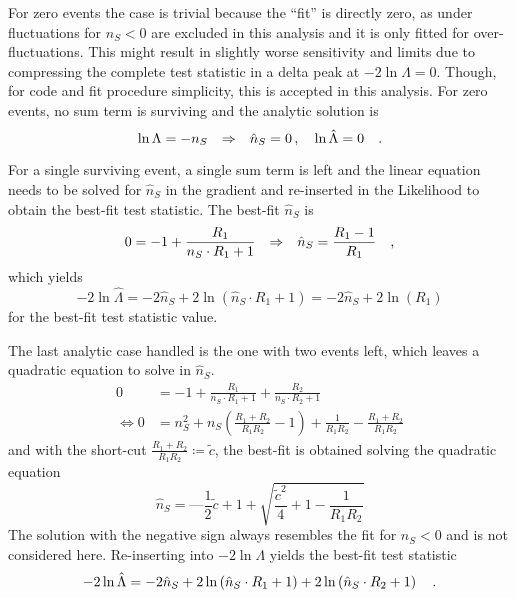 For zero events the case is trivial because the \enquote{fit} is directly zero, as under fluctuations for $n_S < 0$ are excluded in this analysis and it is only fitted for over-fluctuations.
This might result in slightly worse sensitivity and limits due to compressing the complete test statistic in a delta peak at $-2\ln\Lambda=0$.
Though, for code and fit procedure simplicity, this is accepted in this analysis. 
For zero events, no sum term is surviving and the analytic solution is
\begin{equation}
  \ln\Lambda = -n_S
  \quad\text{$\Rightarrow$}\quad
  \hat{n}_S = 0 \, ,\quad \ln\hat{\Lambda} = 0
  \quad\text{.}
\end{equation}

For a single surviving event, a single sum term is left and the linear equation needs to be solved for $\hat{n}_S$ in the gradient and re-inserted in the Likelihood to obtain the best-fit test statistic.
The best-fit $\hat{n}_S$ is
\begin{equation}
  0 = -1 + \frac{R_1}{n_S\cdot R_1 + 1}
  \quad\text{$\Rightarrow$}\quad
  \hat{n}_S = \frac{R_1 - 1}{R_1}
  \quad\text{,}
\end{equation}
which yields
\begin{equation}
  -2\ln\hat{\Lambda}
    = -2\hat{n}_S + 2\ln\left( \hat{n}_S \cdot R_1 + 1 \right)
    = -2\hat{n}_S + 2\ln(R_1)
\end{equation}
for the best-fit test statistic value.

The last analytic case handled is the one with two events left, which leaves a quadratic equation to solve in $\hat{n}_S$.
\begin{align}
  0 &= -1 + \frac{R_1}{n_S\cdot R_1 + 1} + \frac{R_2}{n_S\cdot R_2 + 1} \\
  \Leftrightarrow
  0 &= n_S^2 + n_S \left(\frac{R_1 + R_2}{R_1 R_2} - 1\right) +
       \frac{1}{R_1 R_2} - \frac{R_1 + R_2}{R_1 R_2}
\end{align}
and with the short-cut $\frac{R_1 + R_2}{R_1 R_2} \coloneq\tilde{c}$, the best-fit is obtained solving the quadratic equation
\begin{equation}
  \hat{n}_S = —\frac{1}{2}\tilde{c} + 1 + \sqrt{\frac{\tilde{c}^2}{4} + 1 - \frac{1}{R_1 R_2}}
\end{equation}
The solution with the negative sign always resembles the fit for $n_S < 0$ and is not considered here.
Re-inserting into $-2\ln\Lambda$ yields the best-fit test statistic
\begin{equation}
  -2\ln\hat{\Lambda}
  = -2\hat{n}_S +
      2\ln\left( \hat{n}_S \cdot R_1 + 1 \right) +
      2\ln\left( \hat{n}_S \cdot R_2 + 1 \right)
  \quad\text{.}
\end{equation}


